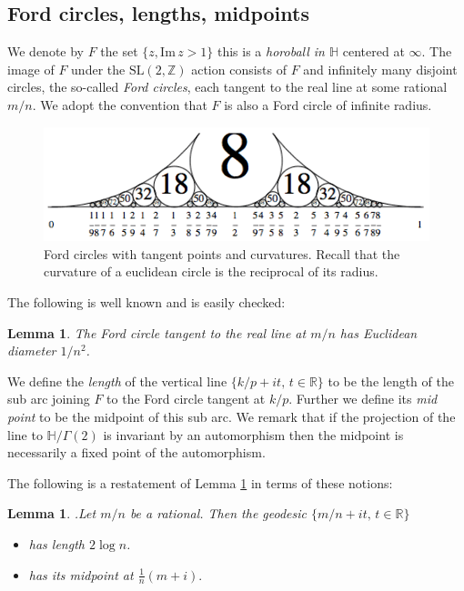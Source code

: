 \documentclass[12pt,a4paper]{amsart}
\newtheorem{lem}[thm]{Lemma}
\def\HH{\mathbb{H}}
\def\im{\mathrm{Im}\,}
\def\xx{\HH/g2}
\def\ZZ{\mathbb{Z}}
\def\RR{\mathbb{R}}
\def\sl2{\mathrm{SL}(2, \ZZ)}
\def\g2{\Gamma(2)}
\def\xx{\HH/\g2}
\begin{document}
\subsection{Ford circles, lengths, midpoints} 
\label{lengths}

We denote by $F$ the set  $\{ z, \im z > 1\}$
this is a \textit{horoball in $\HH$} centered at $\infty$.
The image of $F$ under the $\sl2$ action consists of
$F$ and infinitely many disjoint circles, the so-called \textit{Ford circles}, 
each tangent to the real line at some rational $m/n$.
We adopt the convention that $F$ is also a Ford circle of infinite radius.

  \begin{figure}[ht]
\begin{center}
\includegraphics[scale=.8]{Ford-circles.png} 
\end{center}
\caption{Ford circles with tangent points and curvatures.
Recall that the curvature of a euclidean circle is the reciprocal of its radius.}
\end{figure}

The following is well known and is easily checked:

\begin{lem}\label{ford}
The Ford circle tangent to the real line at $m/n$
has Euclidean diameter $1/n^2$.
\end{lem}


We define the \textit{length} of the vertical line 
$\{ k/p + i t,\, t \in \RR \}$
to be the length of the  sub arc joining 
$F$ to the Ford circle tangent at $k/p$.
Further we define its  \textit{mid point} to be the midpoint of this sub arc.
We remark that if the projection of the line to $\xx$
is invariant by an automorphism 
then the midpoint is necessarily a fixed point of the automorphism.

The following is a restatement of Lemma \ref{ford} in terms of these notions:

\begin{lem}.\label{calcul}
Let $m/n$ be a rational. 
Then the geodesic $\{ m/n + i t,\, t \in \RR \}$
\begin{itemize}
\item has  length $2\log n$. 
\item has its midpoint at $ \frac{1 }{n}(m + i).$
\end{itemize}
\end{lem}
\end{document}
